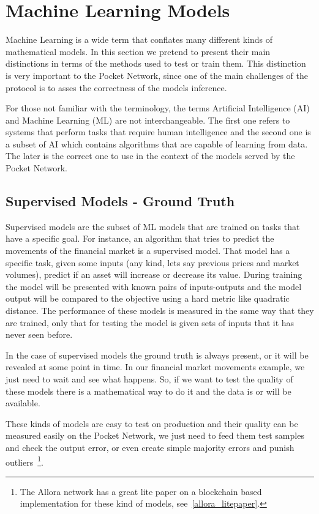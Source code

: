 
\section{Machine Learning Models}\label{sec:ref}

Machine Learning is a wide term that conflates many different kinds of mathematical models. In this section we pretend to present their main distinctions in terms of the methods used to test or train them. This distinction is very important to the Pocket Network, since one of the main challenges of the protocol is to asses the correctness of the models inference. 

For those not familiar with the terminology, the terms Artificial Intelligence (AI) and Machine Learning (ML) are not interchangeable. The first one refers to systems that perform tasks that require human intelligence and the second one is a subset of AI which contains algorithms that are capable of learning from data. The later is the correct one to use in the context of the models served by the Pocket Network.

\subsection{Supervised Models - Ground Truth}
Supervised models are the subset of ML models that are trained on tasks that have a specific goal. For instance, an algorithm that tries to predict the movements of the financial market is a supervised model. That model has a specific task, given some inputs (any kind, lets say previous prices and market volumes), predict if an asset will increase or decrease its value. During training the model will be presented with known pairs of inputs-outputs and the model output will be compared to the objective using a hard metric like quadratic distance.
The performance of these models is measured in the same way that they are trained, only that for testing the model is given sets of inputs that it has never seen before.

In the case of supervised models the ground truth is always present, or it will be revealed at some point in time. In our financial market movements example, we just need to wait and see what happens. So, if we want to test the quality of these models there is a mathematical way to do it and the data is or will be available. 

These kinds of models are easy to test on production and their quality can be measured easily on the Pocket Network, we just need to feed them test samples and check the output error, or even create simple majority errors and punish outliers~\footnote{The Allora network has a great lite paper on a blockchain based implementation for these kind of models, see~\ref{allora_litepaper}. }.


